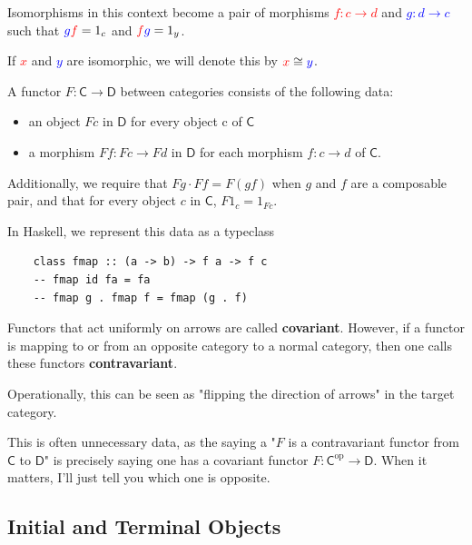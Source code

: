 \documentclass[tikz]{beamer}
\newcommand{\cat}[1]{\bm{ \mathsf{#1} }}
\newcommand{\cc}{\cat{C}}
\newcommand{\dd}{\cat{D}}
\newcommand{\op}[1]{#1^{\text{op}}}
\newcommand{\opc}{\op{\cc}}
\newcommand{\red}[1]{\textcolor{red}{#1}}
\newcommand{\mred}[1]{\textcolor{red}{$#1$}}
\newcommand{\blue}[1]{\textcolor{blue}{#1}}
\newcommand{\mblue}[1]{\textcolor{blue}{$#1$}}
\theoremstyle{definition}
\begin{document}
\frame
{ 
	Isomorphisms in this context become a pair of morphisms \mred{ f : c \to d} and \mblue{g : d \to c} such that $\blue{g}\red{f} = 1_c$ and $\red{f}\blue{g} = 1_y$.
	
	 If \mred{x} and \mblue{y} are isomorphic, we will denote this by $\red{x} \cong \blue{y}$.
}

\frame
{
	
	\begin{definition}[Functor]
		A functor $F : \cc \to \dd$ between categories consists of the following data: 
		
		\begin{itemize}
			\item an object $Fc$ in $\dd$ for every object c of $\cc$
			\item a morphism $Ff : Fc \to Fd$ in $\dd$ for each morphism $f : c \to d$ of $\cc$.
		\end{itemize}
		
		Additionally, we require that $Fg \cdot Ff = F(gf)$ when $g$ and $f$ are a composable pair, and that for every object $c$ in $\cc$, $F1_c = 1_{Fc}$.
	\end{definition}
}

\begin{frame}[fragile]
In Haskell, we represent this data as a typeclass

	\begin{verbatim}
	class fmap :: (a -> b) -> f a -> f c
	-- fmap id fa = fa 
	-- fmap g . fmap f = fmap (g . f)
	\end{verbatim}
	
\end{frame}

\frame
{
	Functors that act uniformly on arrows are called \textbf{covariant}. However, if a functor is mapping to or from an opposite category to a normal category, then one calls these functors \textbf{contravariant}.
	
	 Operationally, this can be seen as "flipping the direction of arrows" in the target category. 
}

\frame
{
	This is often unnecessary data, as the saying a "$F$ is a contravariant functor from $\cc$ to $\dd$" is precisely saying one has a covariant functor $F : \opc \to \dd$. When it matters, I'll just tell you which one is opposite.

}

\subsection{Initial and Terminal Objects}
\end{document}
